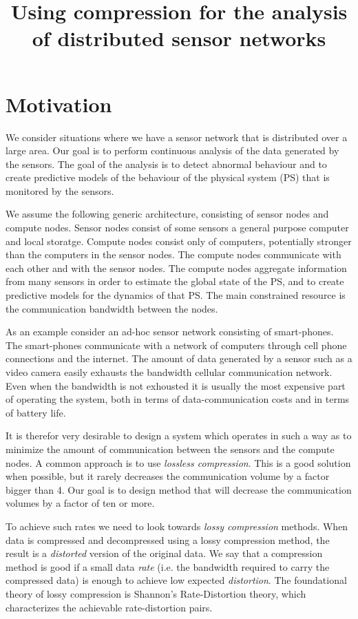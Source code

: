 \documentclass[11pt]{article}
\title{Using compression for the analysis of distributed sensor networks}
\begin{document}
\maketitle

\section{Motivation}
We consider situations where we have a sensor network that is
distributed over a large area. Our goal is to perform continuous
analysis of the data generated by the sensors. The goal of the
analysis is to detect abnormal behaviour and to create predictive
models of the behaviour of the physical system (PS) that is monitored
by the sensors.

We assume the following generic architecture, consisting of sensor
nodes and compute nodes. Sensor nodes consist of some sensors a
general purpose computer and local storatge. Compute nodes consist
only of computers, potentially stronger than the computers in the
sensor nodes. The compute nodes communicate with each other and with
the sensor nodes. The compute nodes aggregate information from many
sensors in order to estimate the global state of the PS,
and to create predictive models for the dynamics of that PS.
The main constrained resource is the communication bandwidth between
the nodes.

As an example consider an ad-hoc sensor network consisting of
smart-phones. The smart-phones communicate with a network of computers
through cell phone connections and the internet.  The amount of data
generated by a sensor such as a video camera easily exhausts the
bandwidth cellular communication network. Even when the bandwidth is
not exhousted it is usually the most expensive part of operating the
system, both in terms of data-communication costs and in terms of
battery life.

It is therefor very desirable to design a system which operates in
such a way as to minimize the amount of communication between the
sensors and the compute nodes. A common approach is to use {\em
  lossless compression}. This is a good solution when possible, but it
rarely decreases the communication volume by a factor bigger than 4.
Our goal is to design method that will decrease the communication
volumes by a factor of ten or more.

To achieve such rates we need to look towards {\em lossy compression}
methods. When data is compressed and decompressed using a lossy
compression method, the result is a {\em distorted} version of the
original data. We say that a compression method is good if a small
data {\em rate} (i.e. the bandwidth required to carry the compressed
data) is enough to achieve low expected {\em distortion}. The
foundational theory of lossy compression is Shannon's Rate-Distortion
theory, which characterizes the achievable rate-distortion pairs.
\end{document}

